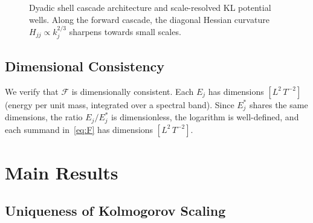 \documentclass[12pt,a4paper]{article}
\theoremstyle{definition}
\theoremstyle{plain}
\theoremstyle{remark}
\begin{document}
\begin{figure}[htbp]
\caption{Dyadic shell cascade architecture and scale-resolved KL potential wells. Along the forward cascade, the diagonal Hessian curvature $H_{jj} \propto k_j^{2/3}$ sharpens towards small scales.}
\label{fig:cascade-architecture}\label{fig:kaskaden-architektur}
\end{figure}

\subsection{Dimensional Consistency}

We verify that $\mathcal{F}$ is dimensionally consistent.  Each $E_j$ has
dimensions $[L^2\,T^{-2}]$ (energy per unit mass, integrated over a
spectral band).  Since $E_j^*$ shares the same dimensions, the ratio
$E_j/E_j^*$ is dimensionless, the logarithm is well-defined, and each
summand in~\eqref{eq:F} has dimensions $[L^2\,T^{-2}]$.

\section{Main Results}\label{sec:results}

\subsection{Uniqueness of Kolmogorov Scaling}
\end{document}
